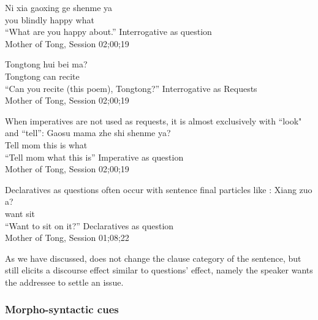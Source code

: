 \gll Ni xia gaoxing ge shenme ya\\
you blindly happy \Cl{} what \Sfp{}\\
``What are you happy about.'' \hfill Interrogative as question \\
Mother of Tong, Session 02;00;19
\eex

\gll Tongtong hui bei ma?\\
Tongtong can recite \\
\trans ``Can you recite (this poem), Tongtong?''
\hfill Interrogative as Requests \\
Mother of Tong, Session 02;00;19
\eex

When imperatives are not used as requests, it is almost exclusively with  ``look" and  ``tell'':
\gll Gaosu mama zhe shi shenme ya?\\
Tell mom this is what \Sfp{}\\
``Tell mom what this is'' \hfill Imperative as question\\
Mother of Tong, Session 02;00;19
\eex

Declaratives as questions often occur with sentence final particles like :
\gll %
Xiang zuo a?\\
want sit \Sfp{}\\
``Want to sit on it?''
\hfill Declaratives as question\\
Mother of Tong, Session 01;08;22
\eex

As we have discussed,  does not change the clause category of the sentence, but still elicits a discourse effect similar to questions' effect, namely the speaker wants the addressee to settle an issue.


\subsubsection{Morpho-syntactic cues}
\label{sec:mancl:corpus:results:syn}


